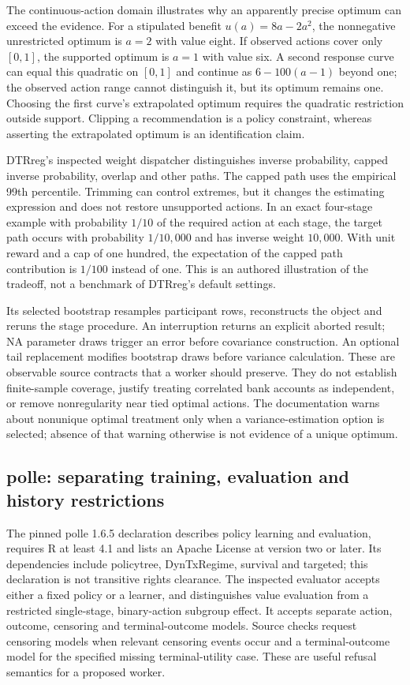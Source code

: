 The continuous-action domain illustrates why an apparently precise optimum can
exceed the evidence. For a stipulated benefit $u(a)=8a-2a^2$, the nonnegative
unrestricted optimum is $a=2$ with value eight. If observed actions cover only
$[0,1]$, the supported optimum is $a=1$ with value six. A second response curve
can equal this quadratic on $[0,1]$ and continue as $6-100(a-1)$ beyond one;
the observed action range cannot distinguish it, but its optimum remains one.
Choosing the first curve's extrapolated optimum requires the quadratic restriction
outside support. Clipping a recommendation is a policy constraint, whereas asserting
the extrapolated optimum is an identification claim.~\citep{exec24_policiesr_reference}

DTRreg's inspected weight dispatcher distinguishes inverse probability, capped inverse
probability, overlap and other paths. The capped path uses the empirical 99th
percentile. Trimming can control extremes, but it changes the estimating expression
and does not restore unsupported actions. In an exact four-stage example with
probability $1/10$ of the required action at each stage, the target path occurs with
probability $1/10{,}000$ and has inverse weight $10{,}000$. With unit reward and a
cap of one hundred, the expectation of the capped path contribution is $1/100$
instead of one. This is an authored illustration of the tradeoff, not a benchmark
of DTRreg's default settings.~\citep{exec24_policiesr_dtrreg,exec24_policiesr_reference}

Its selected bootstrap resamples participant rows, reconstructs the object and
reruns the stage procedure. An interruption returns an explicit aborted result;
NA parameter draws trigger an error before covariance construction. An optional
tail replacement modifies bootstrap draws before variance calculation. These
are observable source contracts that a worker should preserve. They do not
establish finite-sample coverage, justify treating correlated bank accounts as
independent, or remove nonregularity near tied optimal actions. The documentation
warns about nonunique optimal treatment only when a variance-estimation option is
selected; absence of that warning otherwise is not evidence of a unique optimum.
\citep{exec24_policiesr_dtrreg}

\subsection{polle: separating training, evaluation and history restrictions}
The pinned polle 1.6.5 declaration describes policy learning and evaluation, requires
R at least 4.1 and lists an Apache License at version two or later. Its dependencies
include policytree, DynTxRegime, survival and targeted; this declaration is not
transitive rights clearance. The inspected evaluator accepts either a fixed policy
or a learner, and distinguishes value evaluation from a restricted single-stage,
binary-action subgroup effect. It accepts separate action, outcome, censoring and
terminal-outcome models. Source checks request censoring models when relevant
censoring events occur and a terminal-outcome model for the specified missing
terminal-utility case. These are useful refusal semantics for a proposed worker.
\citep{exec24_policiesr_polle}

